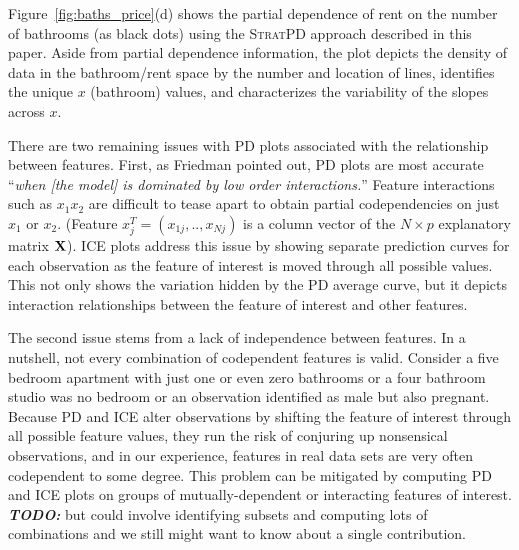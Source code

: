 \documentclass[12pt]{article}
\newcommand{\figref}[1]{Figure~\ref{#1}}
\newcommand{\cut}[1]{}
\newcommand{\todo}[1]{{\bf\em TODO:} {{#1}}}
\newcommand{\spd}{\fontfamily{cmr}\textsc{\small StratPD}}
\begin{document}
\figref{fig:baths_price}(d) shows the partial dependence of rent on the number of bathrooms (as black dots) using the \spd{} approach described in this paper. Aside from partial dependence information, the plot depicts the density of data in the bathroom/rent space by the number and location of lines, identifies the unique $x$ (bathroom) values, and characterizes the variability of the slopes across $x$.

There are two remaining issues with PD plots associated with the relationship between features. First, as Friedman pointed out, PD plots are most accurate ``{\em when {\em [the model]} is dominated by low order interactions.}''  Feature interactions such as $x_1x_2$ are difficult to tease apart to obtain partial codependencies on just $x_1$ or $x_2$. (Feature $x_j^T = (x_{1j}, .., x_{Nj})$ is a column vector of the  $N \times p$ explanatory matrix ${\bf X}$). ICE plots address this issue by showing separate prediction curves for each observation as the feature of interest is moved through all possible values.  This not only shows the variation hidden by the PD average curve, but it depicts interaction relationships between the feature of interest and other features.

The second issue stems from a lack of independence between features.  In a nutshell, not every combination of codependent features is valid. Consider a five bedroom apartment with just one or even zero bathrooms or a four bathroom studio was no bedroom or an observation identified as male but also pregnant.  Because PD and ICE alter observations by shifting the feature of interest through all possible feature values, they run the risk of conjuring up nonsensical observations, and in our experience, features in real data sets are very often codependent to some degree. This problem can be mitigated by computing PD and ICE plots on groups of mutually-dependent or interacting features of interest. \todo{but could involve identifying subsets and computing lots of combinations and we still might want to know about a single contribution.}

\cut{
def toy_weight_data(n):
    df = pd.DataFrame()
    nmen = n//2
    nwomen = n//2
    df['ID'] = range(100,100+n)
    df['sex'] = ['M']*nmen + ['F']*nwomen
    df.loc[df['sex']=='F','pregnant'] = np.random.randint(0,2,size=(nwomen,))
    df.loc[df['sex']=='M','pregnant'] = 0
    df.loc[df['sex']=='M','height'] = 5*12+8 + np.random.uniform(-7, +8, size=(nmen,))
    df.loc[df['sex']=='F','height'] = 5*12+5 + np.random.uniform(-4.5, +5, size=(nwomen,))
    df.loc[df['sex']=='M','education'] = 10 + np.random.randint(0,8,size=nmen)
    df.loc[df['sex']=='F','education'] = 12 + np.random.randint(0,8,size=nwomen)
    df['weight'] = 120 \
                   + (df['height']-df['height'].min()) * 10 \
                   + df['pregnant']*30 \
                   - df['education']*1.2
    df['pregnant'] = df['pregnant'].astype(bool)
    df['education'] = df['education'].astype(int)
    return df
}
\end{document}

